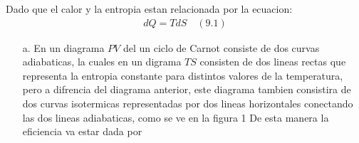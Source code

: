 \documentclass[a4paper]{article}
\begin{document}
    \begin{answer}[Punto 9]
        Dado que el calor y la entropia estan relacionada por la ecuacion:
        \begin{align*}
            dQ = TdS \quad (9.1)
        \end{align*}
        \begin{itemize}
            \item [a.] En un diagrama $PV$ del un ciclo de Carnot consiste de dos curvas adiabaticas, la cuales en un digrama $TS$ consisten de dos lineas rectas que representa la entropia constante para distintos valores de la temperatura, pero a difrencia del diagrama anterior, este diagrama tambien consistira de dos curvas isotermicas representadas por dos lineas horizontales conectando las dos lineas adiabaticas, como se ve en la figura 1
            De esta manera la eficiencia va estar dada por 
    

\end{itemize}
\end{answer}
\end{document}
